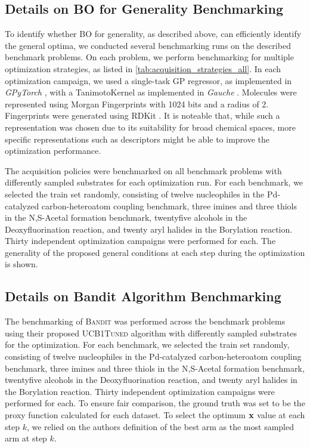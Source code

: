 \subsection{Details on BO for Generality Benchmarking} \label{subsec:BO_benchmark}

To identify whether BO for generality, as described above, can efficiently identify the general optima, we conducted several benchmarking runs on the described benchmark problems.
On each problem, we perform benchmarking for multiple optimization strategies, as listed in \cref{tab:acquisition_strategies_all}.
In each optimization campaign, we used a single-task GP regressor, as implemented in \textit{GPyTorch} \citep{gardner_gpytorch_2018}, with a TanimotoKernel as implemented in \textit{Gauche} \citep{griffiths_gauche_2023}.
Molecules were represented using Morgan Fingerprints \citep{morgan_generation_1965} with 1024 bits and a radius of 2. Fingerprints were generated using RDKit \citep{landrum_rdkit_2023}. It is noteable that, while such a representation was chosen due to its suitability for broad chemical spaces, more specific representations such as descriptors might be able to improve the optimization performance.

The acquisition policies were benchmarked on all benchmark problems with differently sampled substrates for each optimization run.
For each benchmark, we selected the train set randomly, consisting of twelve nucleophiles in the Pd-catalyzed carbon-heteroatom coupling benchmark, three imines and three thiols in the N,S-Acetal formation benchmark, twentyfive alcohols in the Deoxyfluorination reaction, and twenty aryl halides in the Borylation reaction.
Thirty independent optimization campaigns were performed for each.
The generality of the proposed general conditions at each step during the optimization is shown.
\newpage
\subsection{Details on Bandit Algorithm Benchmarking}

The benchmarking of \textsc{Bandit} \citep{wang_identifying_2024} was performed across the benchmark problems using their proposed \textsc{UCB1Tuned} algorithm with differently sampled substrates for the optimization. For each benchmark, we selected the train set randomly, consisting of twelve nucleophiles in the Pd-catalyzed carbon-heteroatom coupling benchmark, three imines and three thiols in the N,S-Acetal formation benchmark, twentyfive alcohols in the Deoxyfluorination reaction, and twenty aryl halides in the Borylation reaction. Thirty independent optimization campaigns were performed for each. To ensure fair comparison, the ground truth was set to be the proxy function calculated for each dataset. To select the optimum ${\mathbf{x}}$ value at each step $k$, we relied on the authors definition of the best arm as the most sampled arm at step $k$.
\newpage
